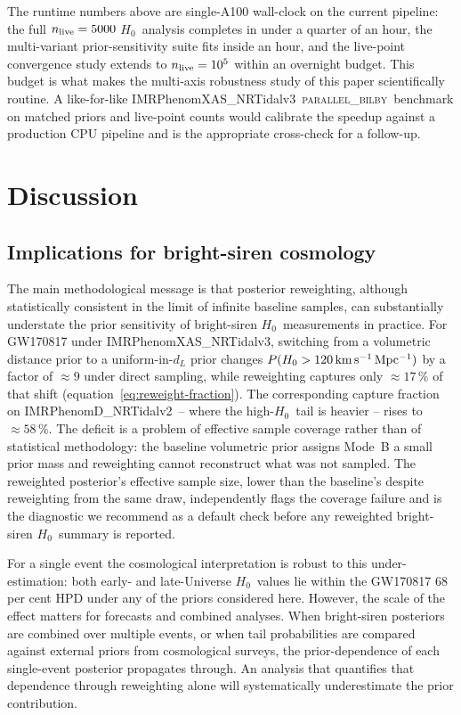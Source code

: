 \documentclass[usenatbib]{mnras}
\newcommand{\kmsmpc}{\ensuremath{\,\rm km\,s^{-1}\,Mpc^{-1}}\xspace}
\newcommand{\hzero}{\ensuremath{H_{0}}\xspace}
\newcommand{\IMR}{IMRPhenomD\_NRTidalv2\xspace}
\newcommand{\IMRX}{IMRPhenomXAS\_NRTidalv3\xspace}
\newcommand{\pbilby}{\textsc{parallel\_bilby}\xspace}
\begin{document}
The runtime numbers above are single-A100 wall-clock on the current pipeline: the full $n_{\rm live}=5000$ \hzero\ analysis completes in under a quarter of an hour, the multi-variant prior-sensitivity suite fits inside an hour, and the live-point convergence study extends to $n_{\rm live}=10^{5}$ within an overnight budget. This budget is what makes the multi-axis robustness study of this paper scientifically routine. A like-for-like \IMRX\ \pbilby\ benchmark on matched priors and live-point counts would calibrate the speedup against a production CPU pipeline and is the appropriate cross-check for a follow-up.

\section{Discussion}
\label{sec:discussion}

\subsection{Implications for bright-siren cosmology}

The main methodological message is that posterior reweighting, although statistically consistent in the limit of infinite baseline samples, can substantially understate the prior sensitivity of bright-siren \hzero\ measurements in practice. For GW170817 under \IMRX, switching from a volumetric distance prior to a uniform-in-$d_L$ prior changes $P(\hzero>120\kmsmpc)$ by a factor of $\approx 9$ under direct sampling, while reweighting captures only $\approx 17\,\%$ of that shift (equation~\ref{eq:reweight-fraction}). The corresponding capture fraction on \IMR\ -- where the high-\hzero\ tail is heavier -- rises to $\approx 58\,\%$. The deficit is a problem of effective sample coverage rather than of statistical methodology: the baseline volumetric prior assigns Mode~B a small prior mass and reweighting cannot reconstruct what was not sampled. The reweighted posterior's effective sample size, lower than the baseline's despite reweighting from the same draw, independently flags the coverage failure and is the diagnostic we recommend as a default check before any reweighted bright-siren \hzero\ summary is reported.

For a single event the cosmological interpretation is robust to this under-estimation: both early- and late-Universe \hzero\ values lie within the GW170817 68 per cent HPD under any of the priors considered here. However, the scale of the effect matters for forecasts \citep{Chen2018Forecast} and combined analyses. When bright-siren posteriors are combined over multiple events, or when tail probabilities are compared against external priors from cosmological surveys, the prior-dependence of each single-event posterior propagates through. An analysis that quantifies that dependence through reweighting alone will systematically underestimate the prior contribution.
\end{document}
